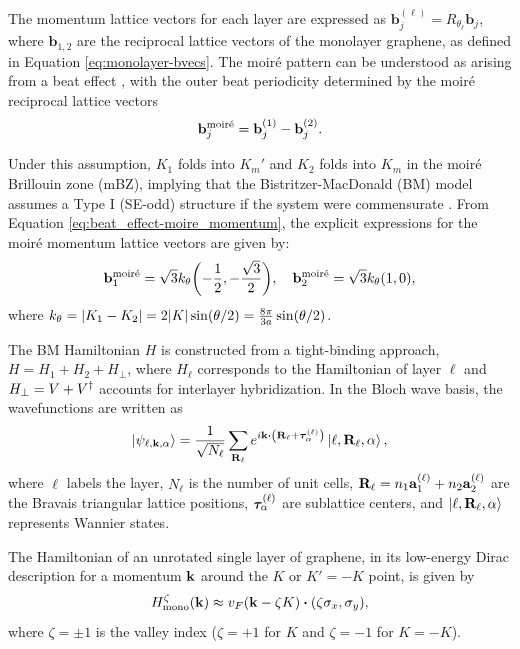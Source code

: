 The momentum lattice vectors for each layer are expressed as \( \mathbf{b}_j^{(\ell)} = R_{\theta_\ell} \mathbf{b}_j \), where \( \mathbf{b}_{1,2} \) are the reciprocal lattice vectors of the monolayer graphene, as defined in Equation \ref{eq:monolayer-bvecs}. The moiré pattern can be understood as arising from a beat effect \cite{handbook2019}, with the outer beat periodicity determined by the moiré reciprocal lattice vectors
\begin{equation} \label{eq:beat_effect-moire_momentum}
{\vb{b}}_j^{\text{moiré}} = {\vb{b}}_{j}^{(1)} - {\vb{b}}_{j}^{(2)}.
\end{equation}

Under this assumption, \( K_1 \) folds into \( K_m' \) and \( K_2 \) folds into \( K_m \) in the moiré Brillouin zone (mBZ), implying that the Bistritzer-MacDonald (BM) model assumes a Type I (SE-odd) structure if the system were commensurate \cite{thesis_angeli, zou2018}. From Equation \ref{eq:beat_effect-moire_momentum}, the explicit expressions for the moiré momentum lattice vectors are given by:
\begin{equation} \label{eq:moire-bvecs}
\vb{b}_1^{\text{moiré}} = \sqrt{3} k_\theta \qty(-\frac{1}{2}, -\frac{\sqrt{3}}{2}), \quad
\vb{b}_2^{\text{moiré}} = \sqrt{3} k_\theta \qty(1, 0),
\end{equation}
where $k_\theta = \abs{K_1-K_2} = 2 \abs{K} \sin(\theta/2) = \frac{8\pi}{3a} \sin(\theta/2)$.

The BM Hamiltonian $H$ is constructed from a tight-binding approach, $H = H_1 + H_2 + H_{\perp}$, where $H_\ell$ corresponds to the Hamiltonian of layer $\ell$ and $H_\perp = V + V^{\dagger}$ accounts for interlayer hybridization. In the Bloch wave basis, the wavefunctions are written as
\begin{equation} \label{eq:BM-blochwave}
\ket{\psi_{\ell, \k, \alpha}} = \frac{1}{\sqrt{N_\ell}} \sum_{\R_\ell} e^{i \k \vdot \qty(\R_\ell + \vtau_{\alpha}^{(\ell)})} \ket{\ell, \R_\ell, \alpha},
\end{equation}
where $\ell$ labels the layer, $N_\ell$ is the number of unit cells, ${\vb{R}}_\ell = n_1 {\vb{a}}_1^{(\ell)} + n_2 {\vb{a}}_2^{(\ell)}$ are the Bravais triangular lattice positions, ${\bm{\tau}}_{\alpha}^{(\ell)}$ are sublattice centers, and $\ket{\ell,{\vb{R}}_\ell,\alpha}$ represents Wannier states.

The Hamiltonian of an unrotated single layer of graphene, in its low-energy Dirac description for a momentum \({\vb{k}}\) around the \(K\) or \(K' = -K\) point, is given by
\begin{equation} \label{eq:single_layer_dirac_hamil_mono}
H_{\text{mono}}^\zeta(\k) \approx v_F (\k - \zeta K) \vdot \qty(\zeta \s_x, \s_y),
\end{equation}
where $\zeta = \pm 1$ is the valley index ($\zeta = +1$ for $K$ and $\zeta = -1$ for $K = -K$).

